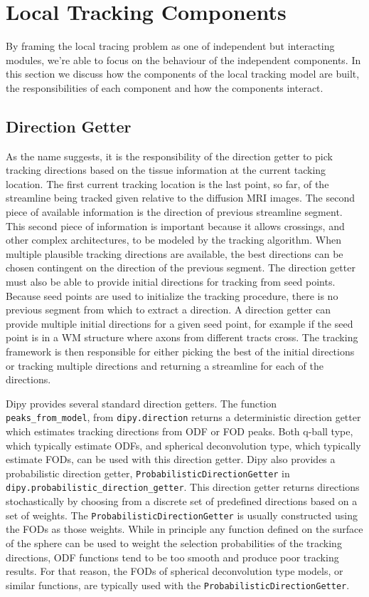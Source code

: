 \section{Local Tracking Components}
    By framing the local tracing problem as one of independent but interacting modules, we're able to focus on the behaviour of the independent components. In this section we discuss how the components of the local tracking model are built, the responsibilities of each component and how the components interact.

\subsection{Direction Getter}
    As the name suggests, it is the responsibility of the direction getter to pick tracking directions based on the tissue information at the current tacking location. The first current tracking location is the last point, so far, of the streamline being tracked given relative to the diffusion MRI images. The second piece of available information is the direction of previous streamline segment. This second piece of information is important because it allows crossings, and other complex architectures, to be modeled by the tracking algorithm. When multiple plausible tracking directions are available, the best directions can be chosen contingent on the direction of the previous segment. The direction getter must also be able to provide initial directions for tracking from seed points. Because seed points are used to initialize the tracking procedure, there is no previous segment from which to extract a direction. A direction getter can provide multiple initial directions for a given seed point, for example if the seed point is in a WM structure where axons from different tracts cross. The tracking framework is then responsible for either picking the best of the initial directions or tracking multiple directions and returning a streamline for each of the directions.
    
    Dipy provides several standard direction getters. The function \verb|peaks_from_model|, from \verb|dipy.direction| returns a deterministic direction getter which estimates tracking directions from ODF or FOD peaks. Both q-ball type, which typically estimate ODFs, and spherical deconvolution type, which typically estimate FODs, can be used with this direction getter. Dipy also provides a probabilistic direction getter, \verb|ProbabilisticDirectionGetter| in \verb|dipy.probabilistic_direction_getter|. This direction getter returns directions stochastically by choosing from a discrete set of predefined directions based on a set of weights. The \verb|ProbabilisticDirectionGetter| is usually constructed using the FODs as those weights. While in principle any function defined on the surface of the sphere can be used to weight the selection probabilities of the tracking directions, ODF functions tend to be too smooth and produce poor tracking results. For that reason, the FODs of spherical deconvolution type models, or similar functions, are typically used with the \verb|ProbabilisticDirectionGetter|.

